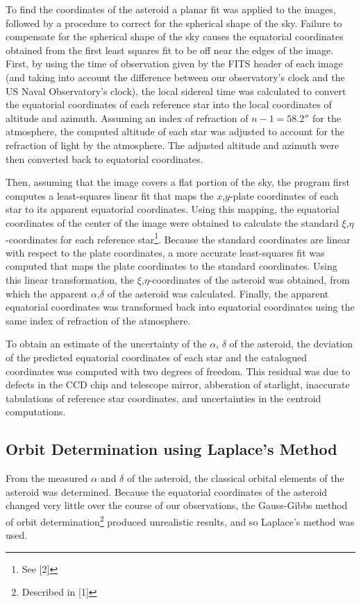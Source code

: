 \documentclass[11pt,a4paper]{article}
\begin{document}
To find the coordinates of the asteroid a planar fit was applied to the images, followed by a procedure to correct for the spherical shape of the sky.
Failure to compensate for the spherical shape of the sky causes the equatorial coordinates obtained from the first least squares fit to be off near the edges of the image.
First, by using the time of observation given by the FITS header of each image (and taking into account the difference between our observatory's clock and the US Naval Observatory's clock), the local sidereal time was calculated to convert the equatorial coordinates of each reference star into the local coordinates of altitude and azimuth.
Assuming an index of refraction of $n-1=58.2''$ for the atmosphere, the computed altitude of each star was adjusted to account for the refraction of light by the atmosphere.
The adjusted altitude and azimuth were then converted back to equatorial coordinates.

Then, assuming that the image covers a flat portion of the sky, the program first computes a least-squares linear fit that maps the $x$,$y$-plate coordinates of each star to its apparent equatorial coordinates.
Using this mapping, the equatorial coordinates of the center of the image were obtained to calculate the standard $\xi$,$\eta$-coordinates for each reference star\footnote{See [2]}. Because the standard coordinates are linear with respect to the plate coordinates, a more accurate least-squares fit was computed that maps the plate coordinates to the standard coordinates. 
Using this linear transformation, the $\xi$,$\eta$-coordinates of the asteroid was obtained, from which the apparent $\alpha$,$\delta$ of the asteroid was calculated.
Finally, the apparent equatorial coordinates was transformed back into equatorial coordinates using the same index of refraction of the atmosphere.

To obtain an estimate of the uncertainty of the $\alpha$, $\delta$ of the asteroid, the deviation of the predicted equatorial coordinates of each star and the catalogued coordinates was computed with two degrees of freedom.
This residual was due to defects in the CCD chip and telescope mirror, abberation of starlight, inaccurate tabulations of reference star coordinates, and uncertainties in the centroid computations.

\subsection{Orbit Determination using Laplace's Method}
From the measured $\alpha$ and $\delta$ of the asteroid, the classical orbital elements of the asteroid was determined. Because the equatorial coordinates of the asteroid changed very little
over the course of our observations, the Gauss-Gibbs method of orbit determination\footnote{Described in [1]} produced unrealistic results, and so Laplace's method was used. 
\end{document}
